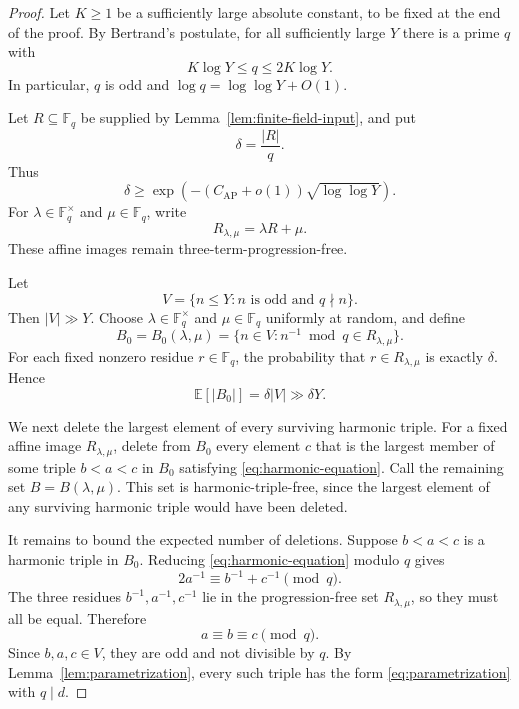 \documentclass[11pt]{article}
\theoremstyle{plain}
\theoremstyle{remark}
\newcommand{\F}{\mathbb F}
\newcommand{\AP}{\mathrm{AP}}
\begin{document}
\begin{proof}
Let $K\ge 1$ be a sufficiently large absolute constant, to be fixed at the end of the proof.  By Bertrand's postulate, for all sufficiently large $Y$ there is a prime $q$ with
\begin{equation}\label{eq:q-choice}
  K\log Y\le q\le 2K\log Y .
\end{equation}
In particular, $q$ is odd and $\log q=\log\log Y+O(1)$.

Let $R\subseteq\F_q$ be supplied by Lemma~\ref{lem:finite-field-input}, and put
\[
  \delta=\frac{|R|}{q}.
\]
Thus
\begin{equation}\label{eq:delta-bound}
  \delta\ge \exp\!\left(-(C_{\AP}+o(1))\sqrt{\log\log Y}\right).
\end{equation}
For $\lambda\in\F_q^\times$ and $\mu\in\F_q$, write
\[
  R_{\lambda,\mu}=\lambda R+\mu .
\]
These affine images remain three-term-progression-free.

Let
\[
  V=\{n\le Y:n\text{ is odd and }q\nmid n\}.
\]
Then $|V|\gg Y$.  Choose $\lambda\in\F_q^\times$ and $\mu\in\F_q$ uniformly at random, and define
\[
  B_0=B_0(\lambda,\mu)=\{n\in V:n^{-1}\bmod q\in R_{\lambda,\mu}\}.
\]
For each fixed nonzero residue $r\in\F_q$, the probability that $r\in R_{\lambda,\mu}$ is exactly $\delta$.  Hence
\begin{equation}\label{eq:initial-expected-size}
  \mathbb E\!\left[|B_0|\right]=\delta |V|\gg \delta Y .
\end{equation}

We next delete the largest element of every surviving harmonic triple. For a fixed affine image $R_{\lambda,\mu}$, delete from $B_0$ every element $c$ that is the largest member of some triple $b<a<c$ in $B_0$ satisfying \eqref{eq:harmonic-equation}.  Call the remaining set $B=B(\lambda,\mu)$.  This set is harmonic-triple-free, since the largest element of any surviving harmonic triple would have been deleted.

It remains to bound the expected number of deletions.  Suppose $b<a<c$ is a harmonic triple in $B_0$.  Reducing \eqref{eq:harmonic-equation} modulo $q$ gives
\[
  2a^{-1}\equiv b^{-1}+c^{-1}\pmod q.
\]
The three residues $b^{-1},a^{-1},c^{-1}$ lie in the progression-free set $R_{\lambda,\mu}$, so they must all be equal.  Therefore
\begin{equation}\label{eq:abc-congruent}
  a\equiv b\equiv c\pmod q .
\end{equation}
Since $b,a,c\in V$, they are odd and not divisible by $q$.  By Lemma~\ref{lem:parametrization}, every such triple has the form \eqref{eq:parametrization} with $q\mid d$.


\end{proof}
\end{document}
